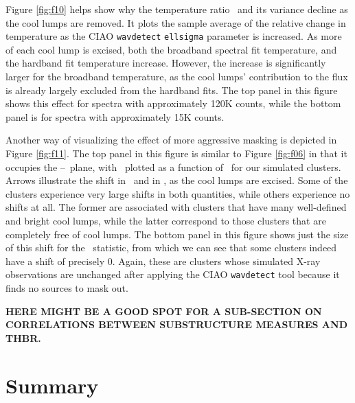 \documentclass[12pt,preprint]{aastex}
\begin{document}
Figure \ref{fig:f10} helps show why the temperature ratio \thbr\ and
its variance decline as the cool lumps are removed.  It plots the
sample average of the relative change in temperature as the CIAO
\verb|wavdetect| \verb|ellsigma| parameter is increased.  As more of
each cool lump is excised, both the broadband spectral fit
temperature, and the hardband fit temperature increase.  However, the
increase is significantly larger for the broadband temperature, as
the cool lumps' contribution to the flux is already largely excluded
from the hardband fits.  The top panel in this figure shows this
effect for spectra with approximately 120K counts, while the bottom
panel is for spectra with approximately 15K counts.

Another way of visualizing the effect of more aggressive masking is
depicted in Figure \ref{fig:f11}.  The top panel in this figure is
similar to Figure \ref{fig:f06} in that it occupies the
\tbroad--\thbr\ plane, with \thbr\ plotted as a function of \tbroad\
for our simulated clusters.  Arrows illustrate the shift in \thbr\ and
in \tbroad, as the cool lumps are excised.  Some of the clusters
experience very large shifts in both quantities, while others
experience no shifts at all.  The former are associated with clusters
that have many well-defined and bright cool lumps, while the latter
correspond to those clusters that are completely free of cool lumps.
The bottom panel in this figure shows just the size of this shift for
the \thbr\ statistic, from which we can see that some clusters indeed
have a shift of precisely 0.  Again, these are clusters whose
simulated X-ray observations are unchanged after applying the CIAO
\verb|wavdetect| tool because it finds no sources to mask out.

{\bf HERE MIGHT BE A GOOD SPOT FOR A SUB-SECTION ON CORRELATIONS BETWEEN SUBSTRUCTURE MEASURES AND THBR.}
\section{Summary}
\end{document}
